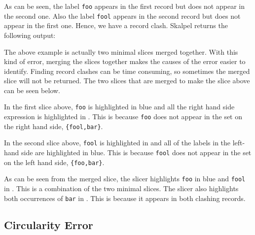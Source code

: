 \documentclass{report}
\begin{document}
\begin{itemize}

As can be seen, the label \texttt{foo} appears in the first record but does
not appear in the second one. Also the label \texttt{fool} appears in
the second record but does not appear in the first one. Hence, we have
a record clash. Skalpel returns the following output:


The above example is actually two minimal slices merged together. With
this kind of error, merging the slices together makes the causes of
the error easier to identify. Finding record clashes can be time
consuming, so sometimes the merged slice will not be returned. The two
slices that are merged to make the slice above can be seen below.



In the first slice above, \texttt{foo} is highlighted in blue and all
the right hand side expression is highlighted in \tesEndPointOne. This
is because \texttt{foo} does not appear in the set on the right hand
side, \texttt{\{fool,bar\}}.

In the second slice above, \texttt{fool} is highlighted in
\tesEndPointOne and all of the labels in the left-hand side are
highlighted in blue. This is because \texttt{fool} does not appear
in the set on the left hand side, \texttt{\{foo,bar\}}.

As can be seen from the merged slice, the slicer highlights
\texttt{foo} in blue and \texttt{fool} in
\tesEndPointOne. This is a combination of the two minimal slices. The slicer
also highlights both occurrences of \texttt{bar} in
\tesEndPointOne. This is because it appears in both clashing records.

\newpage


\subsection{Circularity Error}


\end{itemize}
\end{document}
